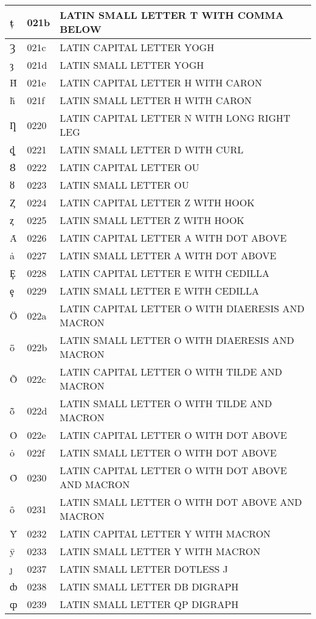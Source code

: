 \documentclass[12pt,letterpaper,openany]{book}
\begin{document}
\begin{center}
\begin{supertabular}{|m{0.25in}|m{0.5in}|m{4in}|}
ț & 021b & LATIN SMALL LETTER T WITH COMMA BELOW\\\hline
Ȝ & 021c & LATIN CAPITAL LETTER YOGH\\\hline
ȝ & 021d & LATIN SMALL LETTER YOGH\\\hline
Ȟ & 021e & LATIN CAPITAL LETTER H WITH CARON\\\hline
ȟ & 021f & LATIN SMALL LETTER H WITH CARON\\\hline
Ƞ & 0220 & LATIN CAPITAL LETTER N WITH LONG RIGHT LEG\\\hline
ȡ & 0221 & LATIN SMALL LETTER D WITH CURL\\\hline
Ȣ & 0222 & LATIN CAPITAL LETTER OU\\\hline
ȣ & 0223 & LATIN SMALL LETTER OU\\\hline
Ȥ & 0224 & LATIN CAPITAL LETTER Z WITH HOOK\\\hline
ȥ & 0225 & LATIN SMALL LETTER Z WITH HOOK\\\hline
Ȧ & 0226 & LATIN CAPITAL LETTER A WITH DOT ABOVE\\\hline
ȧ & 0227 & LATIN SMALL LETTER A WITH DOT ABOVE\\\hline
Ȩ & 0228 & LATIN CAPITAL LETTER E WITH CEDILLA\\\hline
ȩ & 0229 & LATIN SMALL LETTER E WITH CEDILLA\\\hline
Ȫ & 022a & LATIN CAPITAL LETTER O WITH DIAERESIS AND MACRON\\\hline
ȫ & 022b & LATIN SMALL LETTER O WITH DIAERESIS AND MACRON\\\hline
Ȭ & 022c & LATIN CAPITAL LETTER O WITH TILDE AND MACRON\\\hline
ȭ & 022d & LATIN SMALL LETTER O WITH TILDE AND MACRON\\\hline
Ȯ & 022e & LATIN CAPITAL LETTER O WITH DOT ABOVE\\\hline
ȯ & 022f & LATIN SMALL LETTER O WITH DOT ABOVE\\\hline
Ȱ & 0230 & LATIN CAPITAL LETTER O WITH DOT ABOVE AND MACRON\\\hline
ȱ & 0231 & LATIN SMALL LETTER O WITH DOT ABOVE AND MACRON\\\hline
Ȳ & 0232 & LATIN CAPITAL LETTER Y WITH MACRON\\\hline
ȳ & 0233 & LATIN SMALL LETTER Y WITH MACRON\\\hline
ȷ & 0237 & LATIN SMALL LETTER DOTLESS J\\\hline
ȸ & 0238 & LATIN SMALL LETTER DB DIGRAPH\\\hline
ȹ & 0239 & LATIN SMALL LETTER QP DIGRAPH\\\hline

\end{supertabular}
\end{center}
\end{document}
